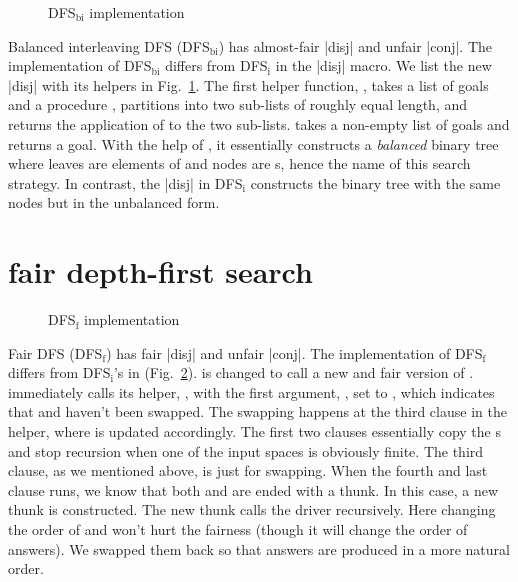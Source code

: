 \documentclass[format=acmlarge, review=true, authordraft=true]{acmart}
\begin{document}
\begin{figure}
	\caption{DFS$_\textrm{bi}$ implementation}
	\label{balanced-disj}
\end{figure}

Balanced interleaving DFS (DFS$_\textrm{bi}$) has almost-fair \scheme|disj| and unfair \scheme|conj|. 
The implementation of DFS$_\textrm{bi}$ differs from DFS$_\textrm{i}$ in the \scheme|disj| macro. We list the 
new \scheme|disj| with its helpers in Fig.~\ref{balanced-disj}. The first helper 
function, , takes a list of goals  and a procedure 
, partitions  into two sub-lists of roughly equal length, 
and returns the application of  to the two sub-lists.  
takes a non-empty list of goals  and returns a goal. With the help 
of , it essentially constructs a \emph{balanced} binary tree 
where leaves are elements of  and nodes are s, hence 
the name of this search strategy. In contrast, the \scheme|disj| in DFS$_\textrm{i}$
constructs the binary tree with the same nodes but in the unbalanced form.

\section{fair depth-first search}

\begin{figure}
	\caption{DFS$_\textrm{f}$ implementation}
	\label{fDFS}
\end{figure}

Fair DFS (DFS$_\textrm{f}$) has fair \scheme|disj| and unfair \scheme|conj|. The implementation of DFS$_\textrm{f}$ 
differs from DFS$_\textrm{i}$'s in  (Fig.~\ref{fDFS}).  is 
changed to call a new and fair version of . 
 immediately calls its helper, 
, with the first argument, , set to 
, which indicates that  and  haven't 
been swapped. The swapping happens at the third  clause in the 
helper, where  is updated accordingly. The first two  
clauses essentially copy the s and stop recursion when one of the 
input spaces is obviously finite. The third clause, as we mentioned above, is 
just for swapping. When the fourth and last clause runs, we know that both 
 and  are ended with a thunk. In this case, a new 
thunk is constructed. The new thunk calls the driver recursively. Here changing 
the order of  and  won't hurt the fairness (though 
it will change the order of answers). We swapped them back so that answers are 
produced in a more natural order.
\end{document}
